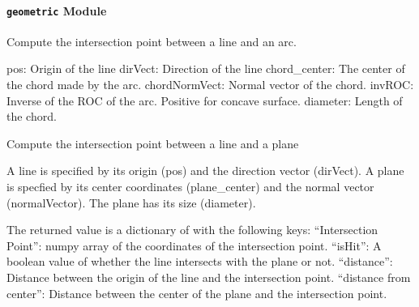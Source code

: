 \documentclass[letterpaper,10pt,english]{sphinxmanual}
\begin{document}
\paragraph{\texttt{geometric} Module}
\label{api/gtrace.optics:geometric-module}\label{api/gtrace.optics:module-gtrace.optics.geometric}

\begin{fulllineitems}
\label{api/gtrace.optics:gtrace.optics.geometric.deflection_angle}
\end{fulllineitems}


\begin{fulllineitems}
\label{api/gtrace.optics:gtrace.optics.geometric.line_arc_intersection}
Compute the intersection point between a line
and an arc.

pos: Origin of the line
dirVect: Direction of the line
chord\_center: The center of the chord made by the arc.
chordNormVect: Normal vector of the chord.
invROC: Inverse of the ROC of the arc. Positive for concave surface.
diameter: Length of the chord.

\end{fulllineitems}


\begin{fulllineitems}
\label{api/gtrace.optics:gtrace.optics.geometric.line_plane_intersection}
Compute the intersection point between a line
and a plane

A line is specified by its origin (pos) and the
direction vector (dirVect).
A plane is specfied by its center coordinates (plane\_center)
and the normal vector (normalVector).
The plane has its size (diameter).

The returned value is a dictionary of with the following keys:
``Intersection Point'': numpy array of the coordinates of the intersection point.
``isHit'': A boolean value of whether the line intersects with the plane or not.
``distance'': Distance between the origin of the line and the intersection point.
``distance from center'': Distance between the center of the plane and the intersection point.

\end{fulllineitems}
\end{document}
